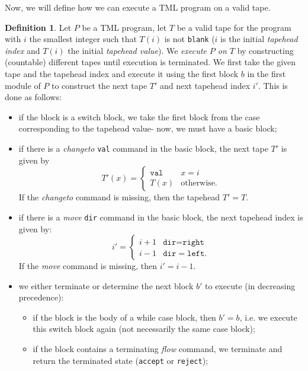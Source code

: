 \documentclass{article}
\theoremstyle{definition}
\newtheorem{definition}[rules]{Definition}
\theoremstyle{plain}
\begin{document}
    Now, we will define how we can execute a TML program on a valid tape.
    \begin{definition}
        Let $P$ be a TML program, let $T$ be a valid tape for the program with $i$ the smallest integer such that $T(i)$ is not \texttt{blank} ($i$ is the initial \emph{tapehead index} and $T(i)$ the initial \textit{tapehead value}). We \emph{execute $P$ on $T$} by constructing (countable) different tapes until execution is terminated. We first take the given tape and the tapehead index and execute it using the first block $b$ in the first module of $P$ to construct the next tape $T'$ and next tapehead index $i'$. This is done as follows:
        \begin{itemize}
            \item if the block is a switch block, we take the first block from the case corresponding to the tapehead value- now, we must have a basic block;
            \item if there is a \textit{changeto} \texttt{val} command in the basic block, the next tape $T'$ is given by 
            \[T'(x) = \begin{cases}
                \texttt{val} & x = i \\
                T(x) & \text{otherwise}.
            \end{cases}\]
            If the \textit{changeto} command is missing, then the tapehead $T' = T$.
            \item if there is a \textit{move} \texttt{dir} command in the basic block, the next tapehead index is given by:
            \[i' = \begin{cases}
                i+1 & \texttt{dir} = \texttt{right} \\
                i-1 & \texttt{dir} = \texttt{left}.
            \end{cases}\]
            If the \textit{move} command is missing, then $i' = i-1$.
            \item we either terminate or determine the next block $b'$ to execute (in decreasing precedence):
            \begin{itemize}
                \item if the block is the body of a while case block, then $b' = b$, i.e. we execute this switch block again (not necessarily the same case block); 
                \item if the block contains a terminating \textit{flow} command, we terminate and return the terminated state (\texttt{accept} or \texttt{reject});

\end{itemize}
\end{itemize}
\end{definition}
\end{document}
